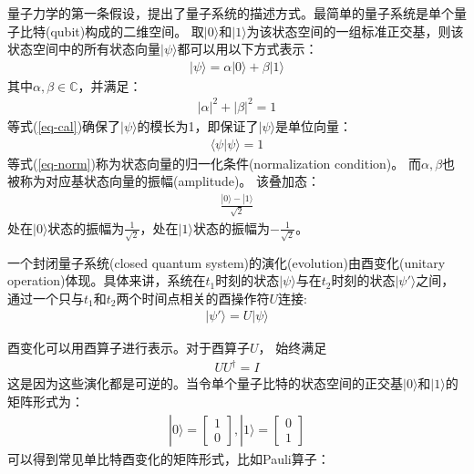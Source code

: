 量子力学的第一条假设，提出了量子系统的描述方式。最简单的量子系统是单个量子比特(qubit)构成的二维空间。
取$|0\rangle$和$|1\rangle$为该状态空间的一组标准正交基，则该状态空间中的所有状态向量$|\psi\rangle$都可以用以下方式表示：
\begin{align}
    |\psi\rangle = \alpha|0\rangle + \beta|1\rangle
\end{align}
其中$\alpha,\beta\in \mathbb{C}$，并满足：
\begin{align}
    |\alpha|^2+|\beta|^2  = 1
    \label{eq-cal}
\end{align}
等式(\ref{eq-cal})确保了$|\psi\rangle$的模长为1，即保证了$|\psi\rangle$是单位向量：
\begin{align}
    \langle\psi|\psi\rangle = 1
    \label{eq-norm}
\end{align}
等式(\ref{eq-norm})称为状态向量的归一化条件(normalization condition)。
而\(\alpha,\beta\)也被称为对应基状态向量的振幅(amplitude)。
该叠加态：
\begin{align}
    \frac{|0\rangle-|1\rangle}{\sqrt{2}}
\end{align}
处在$|0\rangle$状态的振幅为$\frac{1}{\sqrt{2}}$，处在$|1\rangle$状态的振幅为$-\frac{1}{\sqrt{2}}$。
\begin{theorem}
    一个封闭量子系统(closed quantum system)的演化(evolution)由酉变化(unitary operation)体现。具体来讲，系统在$t_1$时刻的状态$|\psi\rangle$与在$t_2$时刻的状态$|\psi'\rangle$之间，通过一个只与$t_1$和$t_2$两个时间点相关的酉操作符$U$连接:
    \begin{align}
        |\psi'\rangle = U|\psi\rangle
    \end{align}
\end{theorem}
酉变化可以用酉算子进行表示。对于酉算子$U$， 始终满足
\begin{align}
    U U^\dagger = I
\end{align}
这是因为这些演化都是可逆的。当令单个量子比特的状态空间的正交基$|0\rangle$和$|1\rangle$的矩阵形式为：
\begin{align}
    |0\rangle = \left[\begin{matrix}
        1\\0
    \end{matrix}\right],|1\rangle = \left[\begin{matrix}
        0\\1
    \end{matrix}\right]
\end{align}
可以得到常见单比特酉变化的矩阵形式，比如Pauli算子：
